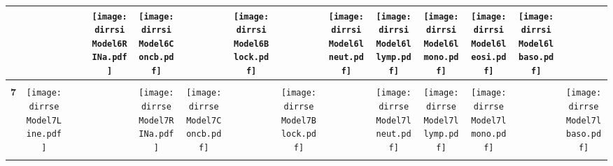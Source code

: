 \documentclass[landscape]{article}
\def \dirrsi{U:/R/RA/Data/RFI-newdata/resultsimulation/ad/Model6.Line.Concb.RINa.lneut.llymp.lmono.leosi.lbaso.Block/}
\def \dirrse{U:/R/RA/Data/RFI-newdata/resultsimulation/ad/Model7.Line.Concb.RINa.lneut.llymp.lmono.lbaso.Block/}
\begin{document}
\begin{table}
\begin{tabular}{ccccccccccccccc}
      &
      &
      &
      &\texttt{[image: \\dirrsi Model6RINa.pdf]}
      &\texttt{[image: \\dirrsi Model6Concb.pdf]}
      &
      &\texttt{[image: \\dirrsi Model6Block.pdf]}
      &
      &\texttt{[image: \\dirrsi Model6lneut.pdf]}
      &\texttt{[image: \\dirrsi Model6llymp.pdf]}
      &\texttt{[image: \\dirrsi Model6lmono.pdf]}
      &\texttt{[image: \\dirrsi Model6leosi.pdf]}
      &\texttt{[image: \\dirrsi Model6lbaso.pdf]}
     \\[3.5pt]
     \hline
     \\[3.5pt]
     {\Huge \textbf{7}} 
      &\texttt{[image: \\dirrse Model7Line.pdf]}
      &
      &
      &
      &\texttt{[image: \\dirrse Model7RINa.pdf]}
      &\texttt{[image: \\dirrse Model7Concb.pdf]}
      &
      &\texttt{[image: \\dirrse Model7Block.pdf]}
      &
      &\texttt{[image: \\dirrse Model7lneut.pdf]}
      &\texttt{[image: \\dirrse Model7llymp.pdf]}
      &\texttt{[image: \\dirrse Model7lmono.pdf]}
      &
      &\texttt{[image: \\dirrse Model7lbaso.pdf]}
     \\[3.5pt]
     \hline
     \\[3.5pt]

\end{tabular}
\end{table}
\end{document}
